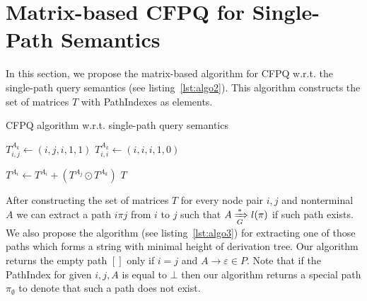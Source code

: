 \section{Matrix-based CFPQ for Single-Path Semantics}
In this section, we propose the matrix-based algorithm for CFPQ w.r.t. the single-path query semantics (see listing~\ref{lst:algo2}). This algorithm constructs the set of matrices $T$ with PathIndexes as elements.
{\small
	\begin{algorithm}
		\begin{algorithmic}[1]
			\caption{CFPQ algorithm w.r.t. single-path query semantics}
			\label{lst:algo2}
			{$T^{A_k}_{i,j} \gets (i,j,i,1,1)$}
			\EndFor
			{$T^{A_k}_{i,i} \gets (i,i,i,1,0)$}
			\EndFor
			
			{ $T^{A_i} \gets T^{A_i} + (T^{A_j} \odot T^{A_k})$ } 
			\EndFor
			\EndWhile
			\State \Return $T$
			\EndFunction
		\end{algorithmic}
	\end{algorithm}
}

After constructing the set of matrices $T$ for every node pair $i, j$ and nonterminal $A$ we can extract a path $i \pi j$ from $i$ to $j$ such that $A \xRightarrow[G]{*} l(\pi)$ if such path exists. We also propose the algorithm (see listing~\ref{lst:algo3}) for extracting one of those paths which forms a string with minimal height of derivation tree. Our algorithm returns the empty path $[]$ only if $i = j$ and $A \to \varepsilon \in P$. Note that if the PathIndex for given $i,j,A$ is equal to $\bot$ then our algorithm returns a special path $\pi_{\emptyset}$ to denote that such a path does not exist.

